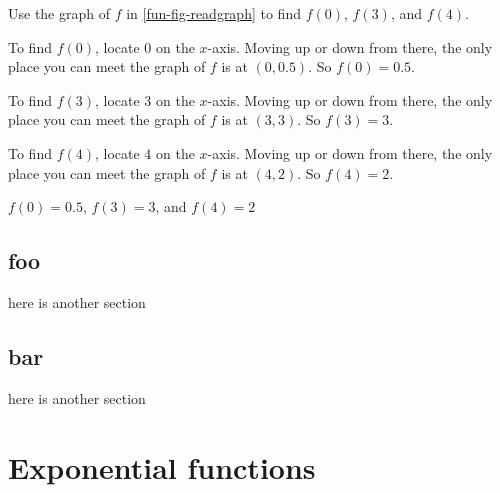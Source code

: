 \begin{checkpoint}
\begin{problem}
Use the graph of $f$ in \cref{fun-fig-readgraph} to find $f(0)$, $f(3)$, and $f(4)$.
%
\begin{longsolution}
%
 To find $f(0)$, locate $0$ on the $x$-axis. Moving up or down from there, the only place you can meet the graph
					of $f$ is at $(0,0.5)$. So $f(0)=0.5$.
%
\par  To find $f(3)$, locate $3$ on the $x$-axis. Moving up or down from there, the only place you can meet the graph
                                        of $f$ is at $(3,3)$. So $f(3)=3$.
%
\par  To find $f(4)$, locate $4$ on the $x$-axis. Moving up or down from there, the only place you can meet the graph
                                        of $f$ is at $(4,2)$. So $f(4)=2$.
%

%
\end{longsolution}
%
\begin{shortsolution}
%
$f(0)=0.5$, $f(3)=3$, and $f(4)=2$
					
%
\end{shortsolution}
%
\end{problem}
%
\end{checkpoint}
%
\typeout{************************************************}
\typeout{************************************************}
%
\section{foo}
%
here is another section
%
\typeout{************************************************}
\typeout{************************************************}
%
\section{bar}
%
here is another section
%
\typeout{************************************************}
\typeout{************************************************}
%
\chapter{Exponential functions}
%
\begin{comment}
This file was created using ./xsl/omd2tex.xsl,
there is no point in editing it :)

This file is all about exponential functions.
\end{comment}

